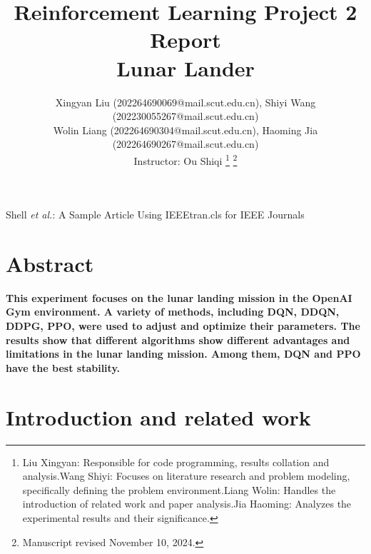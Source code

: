 \documentclass[conference]{IEEEtran}
\begin{document}
\title{Reinforcement Learning Project 2 Report\\ Lunar Lander}

\author{Xingyan Liu (202264690069@mail.scut.edu.cn), Shiyi Wang (202230055267@mail.scut.edu.cn) \\Wolin Liang (202264690304@mail.scut.edu.cn), Haoming Jia (202264690267@mail.scut.edu.cn) 
\\Instructor: Ou Shiqi
\thanks{Liu Xingyan: Responsible for code programming, results collation and analysis.Wang Shiyi: Focuses on literature research and problem modeling, specifically defining the problem environment.Liang Wolin: Handles the introduction of related work and paper analysis.Jia Haoming: Analyzes the experimental results and their significance.}%
\thanks{Manuscript revised November 10, 2024.}}

%
{Shell \MakeLowercase{\textit{et al.}}: A Sample Article Using IEEEtran.cls for IEEE Journals}

\maketitle
\section*{Abstract}


\par\textbf{This experiment focuses on the lunar landing mission in the OpenAI Gym environment. A variety of methods, including DQN, DDQN, DDPG, PPO, were used to adjust and optimize their parameters. The results show that different algorithms show different advantages and limitations in the lunar landing mission. Among them, DQN and PPO have the best stability.}

\section{Introduction and related work}
\end{document}
